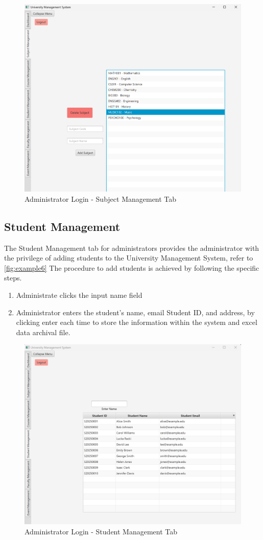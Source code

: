 \begin{figure}[h!]
    \centering
    \centering\includegraphics[width=0.7\linewidth]{figures/Subject_Management.png}
        \caption{Administrator Login - Subject Management Tab}
        \label{fig:example5} 
\end{figure}

\newpage
\subsection{Student Management}

The Student Management tab for administrators provides the administrator with the privilege of adding students to the University Management System, refer to \autoref{fig:example6} The procedure to add students is achieved by following the specific steps.

\begin{enumerate}
    \item Administrate clicks the input name field
    \item Administrator enters the student's name, email Student ID, and address, by clicking enter each time to store the information within the system and excel data archival file.
\end{enumerate}

\begin{figure}[h!]
    \centering
        \centering\includegraphics[width=0.7\linewidth]{figures/Student_Management.png}
        \caption{Administrator Login - Student Management Tab}
        \label{fig:example6}
        \FloatBarrier
\end{figure}


